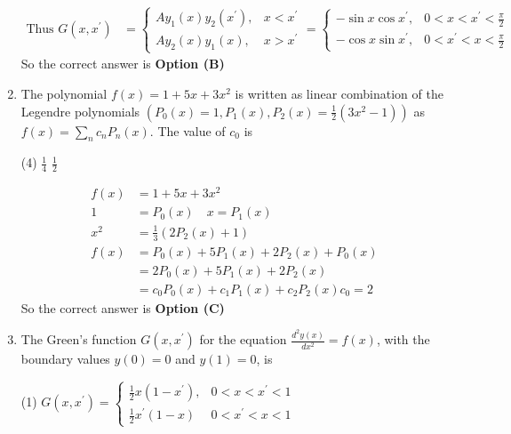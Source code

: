 \begin{enumerate}[label=\color{ocre}\textbf{\arabic*.}]
\begin{answer}
\begin{align*}
		\text{Thus }G\left(x, x^{\prime}\right)&=\left\{\begin{array}{ll}A y_{1}(x) y_{2}\left(x^{\prime}\right), & x<x^{\prime} \\ A y_{2}(x) y_{1}(x), & x>x^{\prime}\end{array}=\left\{\begin{array}{ll}-\sin x \cos x^{\prime}, & 0<x<x^{\prime}<\frac{\pi}{2} \\ -\cos x \sin x^{\prime}, & 0<x^{\prime}<x<\frac{\pi}{2}\end{array}\right.\right.
		\end{align*}
		So the correct answer is \textbf{Option (B)}
	\end{answer}
	\item The polynomial $f(x)=1+5 x+3 x^{2}$ is written as linear combination of the Legendre polynomials
	$\left(P_{0}(x)=1, P_{1}(x), P_{2}(x)=\frac{1}{2}\left(3 x^{2}-1\right)\right)$ as $f(x)=\sum_{n} c_{n} P_{n}(x)$. The value of $c_{0}$ is
	{}
	\begin{tasks}(4)
		\task[\textbf{A.}] $\frac{1}{4}$
		\task[\textbf{B.}] $\frac{1}{2}$
	\end{tasks}
	\begin{answer}
		\begin{align*}
		f(x)&=1+5 x+3 x^{2}\\
		1&=P_{0}(x) \quad x=P_{1}(x)\\
		x^{2}&=\frac{1}{3}\left(2 P_{2}(x)+1\right)\\
		f(x)&=P_{0}(x)+5 P_{1}(x)+2 P_{2}(x)+P_{0}(x)\\
		&=2 P_{0}(x)+5 P_{1}(x)+2 P_{2}(x)\\
		&=c_{0} P_{0}(x)+c_{1} P_{1}(x)+c_{2} P_{2}(x) c_{0}=2
		\end{align*}
		So the correct answer is \textbf{Option (C)}
	\end{answer}
	\item The Green's function $G\left(x, x^{\prime}\right)$ for the equation $\frac{d^{2} y(x)}{d x^{2}}=f(x)$, with the boundary values $y(0)=0$ and $y(1)=0$, is
	{}
	\begin{tasks}(1)
		\task[\textbf{A.}] $G\left(x, x^{\prime}\right)=\left\{\begin{array}{ll}\frac{1}{2} x\left(1-x^{\prime}\right), & 0<x<x^{\prime}<1 \\ \frac{1}{2} x^{\prime}(1-x) & 0<x^{\prime}<x<1\end{array}\right.$

\end{tasks}
\end{enumerate}
